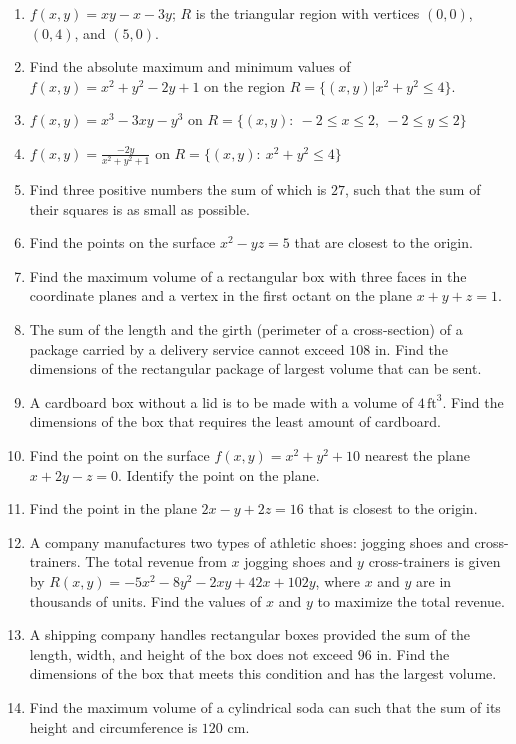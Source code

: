 \documentclass{exercises}
\begin{document}
\begin{enumerate}[resume]
\item $f(x,y)=xy-x-3y$; $R$ is the triangular region with vertices $(0,0)$, $(0,4)$, and $(5,0)$.
\item Find the absolute maximum and minimum values of $f(x,y)=x^{2}+y^{2}-2y+1$ on the region $R=\{(x,y)|x^{2}+y^{2}\le4\}$.
\item $f(x,y)=x^{3}-3xy-y^{3}$ on $R=\{(x,y):\ -2\le x\le2,\ -2\le y\le2\}$
\item $f(x,y)=\frac{-2y}{x^{2}+y^{2}+1}$ on $R=\{(x,y):\ x^{2}+y^{2}\le4\}$
\item Find three positive numbers the sum of which is $27$, such that the sum of their squares is as small as possible.
\item Find the points on the surface $x^{2}-yz=5$ that are closest to the origin.
\item Find the maximum volume of a rectangular box with three faces in the coordinate planes and a vertex in the first octant on the plane $x+y+z=1$.
\item The sum of the length and the girth (perimeter of a cross-section) of a package carried by a delivery service cannot exceed $108$ in. Find the dimensions of the rectangular package of largest volume that can be sent.
\item A cardboard box without a lid is to be made with a volume of $4\,\text{ft}^{3}$. Find the dimensions of the box that requires the least amount of cardboard.
\item Find the point on the surface $f(x,y)=x^{2}+y^{2}+10$ nearest the plane $x+2y-z=0$. Identify the point on the plane.
\item Find the point in the plane $2x-y+2z=16$ that is closest to the origin.
\item A company manufactures two types of athletic shoes: jogging shoes and cross-trainers. The total revenue from $x$ jogging shoes and $y$ cross-trainers is given by $R(x,y)=-5x^{2}-8y^{2}-2xy+42x+102y$, where $x$ and $y$ are in thousands of units. Find the values of $x$ and $y$ to maximize the total revenue.
\item A shipping company handles rectangular boxes provided the sum of the length, width, and height of the box does not exceed $96$ in. Find the dimensions of the box that meets this condition and has the largest volume.
\item Find the maximum volume of a cylindrical soda can such that the sum of its height and circumference is $120$ cm.
\end{enumerate}
\end{document}
